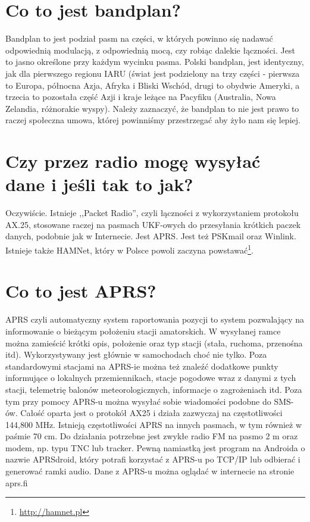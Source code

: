 \documentclass[a4paper,12pt]{article}
\begin{document}
\section{Co to jest bandplan?}
Bandplan to jest podział pasm na części, w których powinno się nadawać odpowiednią modulacją, z odpowiednią mocą, czy robiąc dalekie łączności. Jest to jasno określone przy każdym wycinku pasma. 
Polski bandplan, jest identyczny, jak dla pierwszego regionu IARU (świat jest podzielony na trzy części - pierwsza to Europa, północna Azja, Afryka i Bliski Wschód, drugi to obydwie Ameryki, a trzecia to pozostała część Azji i kraje leżące na Pacyfiku (Australia, Nowa Zelandia, różnorakie wyspy). Należy zaznaczyć, że bandplan to nie jest prawo to raczej społeczna umowa, której powinniśmy przestrzegać aby żyło nam się lepiej. 

\section{Czy przez radio mogę wysyłać dane i jeśli tak to jak?}
Oczywiście. Istnieje ,,Packet Radio'', czyli łączności z wykorzystaniem protokołu AX.25, stosowane raczej na pasmach UKF-owych do przesyłania krótkich paczek danych, podobnie jak w Internecie.
Jest APRS.
Jest też PSKmail oraz Winlink.
Istnieje także HAMNet, który w Polsce powoli zaczyna powstawać\footnote{\url{http://hamnet.pl}}.

\section{Co to jest APRS?}
APRS czyli automatyczny system raportowania pozycji to system pozwalający na informowanie o bieżącym położeniu stacji amatorskich. W wysyłanej ramce można zamieścić krótki opis, położenie oraz typ stacji (stała, ruchoma, przenośna itd). Wykorzystywany jest głównie w samochodach choć nie tylko. Poza standardowymi stacjami na APRS-ie można też znaleźć dodatkowe punkty informujące o lokalnych przemiennikach, stacje pogodowe wraz z danymi z tych stacji, telemetrię balonów meteorologicznych, informacje o zagrożeniach itd. 
Poza tym przy pomocy APRS-u można wysyłać sobie wiadomości podobne do SMS-ów.
Całość oparta jest o protokół AX25 i działa zazwyczaj na częstotliwości 144,800 MHz. Istnieją częstotliwości APRS na innych pasmach, w tym również w paśmie 70 cm.
Do działania potrzebne jest zwykłe radio FM na pasmo 2 m oraz modem, np. typu TNC lub tracker. 
Pewną namiastką jest program na Androida o nazwie APRSdroid, który potrafi korzystać z APRS-u po TCP/IP lub odbierać i generować ramki audio.
Dane z APRS-u można oglądać w internecie na stronie aprs.fi
\end{document}
